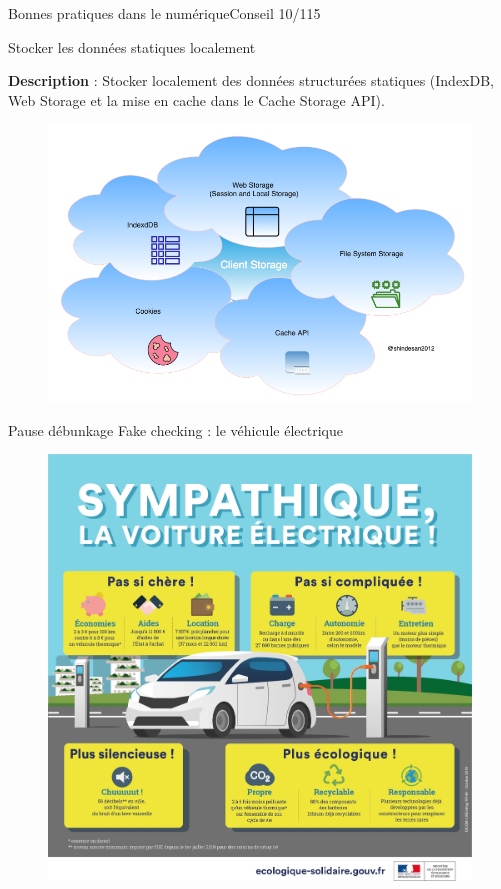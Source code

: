 \begin{frame}{Bonnes pratiques dans le numérique}{Conseil 10/115}

\begin{block}{Stocker les données statiques localement}

\textbf{Description} :
Stocker localement des données structurées statiques (IndexDB, Web Storage et la mise en cache dans le Cache Storage API).

\end{block}

\begin{figure}
    \centering
    \includegraphics[scale=0.29]{chapitre2/wdd1/fig/storage.png}
\end{figure}

\end{frame}



\begin{frame}{Pause débunkage }{Fake checking : le véhicule électrique}

\begin{figure}
    \centering
    \includegraphics[scale=0.2]{chapitre2/wdd1/fig/ecovoiture.jpeg}
\end{figure}


\end{frame}
